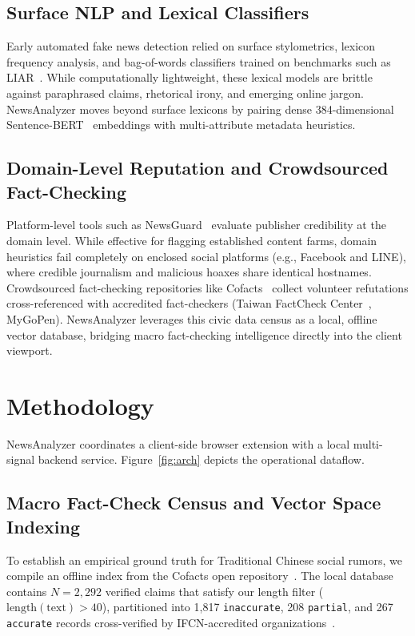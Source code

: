 \documentclass[twoside]{llncs}
\begin{document}
\subsection{Surface NLP and Lexical Classifiers}
Early automated fake news detection relied on surface stylometrics, lexicon frequency analysis, and bag-of-words classifiers trained on benchmarks such as LIAR~\cite{wang2017liar, perez2018automatic, rashkin2017truth, potthast2018stylometric}. While computationally lightweight, these lexical models are brittle against paraphrased claims, rhetorical irony, and emerging online jargon. NewsAnalyzer moves beyond surface lexicons by pairing dense 384-dimensional Sentence-BERT~\cite{reimers2019sbert} embeddings with multi-attribute metadata heuristics.

\subsection{Domain-Level Reputation and Crowdsourced Fact-Checking}
Platform-level tools such as NewsGuard~\cite{Bianchi2024trustworthiness} evaluate publisher credibility at the domain level. While effective for flagging established content farms, domain heuristics fail completely on enclosed social platforms (e.g., Facebook and LINE), where credible journalism and malicious hoaxes share identical hostnames. Crowdsourced fact-checking repositories like Cofacts~\cite{cofacts2020, lim2023factchecking} collect volunteer refutations cross-referenced with accredited fact-checkers (Taiwan FactCheck Center~\cite{tfc2023}, MyGoPen). NewsAnalyzer leverages this civic data census as a local, offline vector database, bridging macro fact-checking intelligence directly into the client viewport.

\section{Methodology}

NewsAnalyzer coordinates a client-side browser extension with a local multi-signal backend service. Figure~\ref{fig:arch} depicts the operational dataflow.

\subsection{Macro Fact-Check Census and Vector Space Indexing}
To establish an empirical ground truth for Traditional Chinese social rumors, we compile an offline index from the Cofacts open repository~\cite{cofacts2020, lim2023factchecking}. The local database contains $N=2{,}292$ verified claims that satisfy our length filter ($\text{length}(\text{text}) > 40$), partitioned into 1,817 \texttt{inaccurate}, 208 \texttt{partial}, and 267 \texttt{accurate} records cross-verified by IFCN-accredited organizations~\cite{ifcn2020, tfc2023}.
\end{document}
